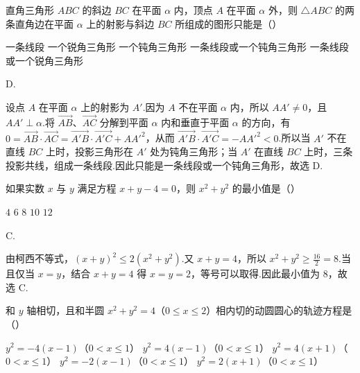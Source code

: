\documentclass[UTF8,a4paper,oneside,11pt]{ctexbook}
\begin{document}
\begin{problem}

直角三角形 \(ABC\) 的斜边 \(BC\) 在平面 \(\alpha \) 内，顶点 \(A\) 在平面 \(\alpha \) 外，则 \(\triangle ABC \) 的两条直角边在平面 \(\alpha \) 上的射影与斜边 \(BC\) 所组成的图形只能是（\quad）

\choicesfive
    {一条线段}
    {一个锐角三角形}
    {一个钝角三角形}
    {一条线段或一个钝角三角形}
    {一条线段或一个锐角三角形}
\end{problem}

\begin{answer}
D.
\end{answer}

\begin{solution}
设点 \(A\) 在平面 \(\alpha\) 上的射影为 \(A'\).因为 \(A\) 不在平面 \(\alpha\) 内，所以 \(AA'\ne0\)，且 \(AA'\perp\alpha\).将 \(\overrightarrow{AB}\)、\(\overrightarrow{AC}\) 分解到平面 \(\alpha\) 内和垂直于平面 \(\alpha\) 的方向，有
\(0=\overrightarrow{AB}\cdot\overrightarrow{AC}=\overrightarrow{A'B}\cdot\overrightarrow{A'C}+AA'^{2}\)，从而 \(\overrightarrow{A'B}\cdot\overrightarrow{A'C}=-AA'^{2}<0\).所以当 \(A'\) 不在直线 \(BC\) 上时，投影三角形在 \(A'\) 处为钝角三角形；当 \(A'\) 在直线 \(BC\) 上时，三条投影共线，组成一条线段.因此只能是一条线段或一个钝角三角形，故选 D.
\end{solution}

\begin{problem}

如果实数 \(x\) 与 \(y\) 满足方程 \(x + y - 4 = 0 \)，则 \(x^{2} + y^{2} \) 的最小值是（\quad）

\choicesfive
    {\(4\)}
    {\(6\)}
    {\(8\)}
    {\(10\)}
    {\(12\)}
\end{problem}

\begin{answer}
C.
\end{answer}

\begin{solution}
由柯西不等式，\((x+y)^2\leqslant2(x^2+y^2)\).又 \(x+y=4\)，所以 \(x^2+y^2\geqslant\frac{16}{2}=8\).当且仅当 \(x=y\)，结合 \(x+y=4\) 得 \(x=y=2\)，等号可以取得.因此最小值为 \(8\)，故选 C.
\end{solution}

\begin{problem}

和 \(y\) 轴相切，且和半圆 \(x^{2} + y^{2} = 4\)（\(0 \leqslant x \leqslant 2\)）相内切的动圆圆心的轨迹方程是（\quad）

\choicesfive
    {\(y^{2} = -4(x - 1)\)（\(0 < x \leqslant 1\)）}
    {\(y^{2} = 4(x - 1)\)（\(0 < x \leqslant 1\)）}
    {\(y^{2}=4(x+1)\)（\(0<x\leqslant1\)）}
    {\(y^{2}=-2(x-1)\)（\(0<x\leqslant1\)）}
    {\(y^{2}=2(x+1)\)（\(0<x\leq1\)）}
\end{problem}
\end{document}
